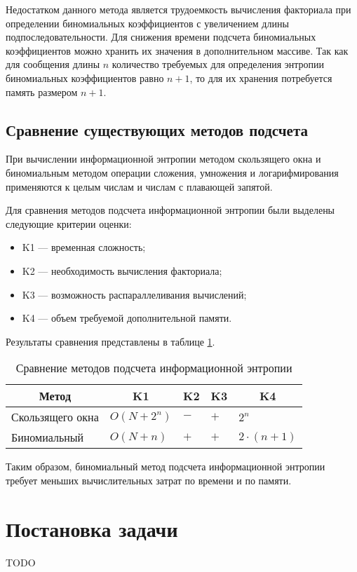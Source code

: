 Недостатком данного метода является трудоемкость вычисления факториала при определении биномиальных коэффициентов с увеличением длины подпоследовательности. Для снижения времени подсчета биномиальных коэффициентов можно хранить их значения в дополнительном массиве. Так как для сообщения длины $n$ количество требуемых для определения энтропии биномиальных коэффициентов равно $n + 1$, то для их хранения потребуется память размером $n + 1$.

\subsection{Сравнение существующих методов подсчета}

При вычислении информационной энтропии методом скользящего окна и биномиальным методом операции сложения, умножения и логарифмирования применяются к целым числам и числам с плавающей запятой.

Для сравнения методов подсчета информационной энтропии были выделены следующие критерии оценки:

\begin{itemize}
	\item K1 --- временная сложность;
	\item K2 --- необходимость вычисления факториала;
	\item K3 --- возможность распараллеливания вычислений;
	\item K4 --- объем требуемой дополнительной памяти.
\end{itemize}

Результаты сравнения представлены в таблице \ref{tab:comparison}.

\begin{table}[h]
    \caption{Сравнение методов подсчета информационной энтропии}
    \begin{center}
        \begin{tabular}{|l|l|l|l|l|}
        		\hline
            \multicolumn{1}{|c}{\textbf{Метод}} & 
            \multicolumn{1}{|c|}{\textbf{K1}} &
            \multicolumn{1}{c|}{\textbf{K2}} &
            \multicolumn{1}{c|}{\textbf{K3}} & 
            \multicolumn{1}{c|}{\textbf{K4}} \\ \hline
            Скользящего окна &  $O(N + 2^n)$ & $-$ & $+$ & $2^n$ \\ \hline
            Биномиальный &  $O(N + n)$ & $+$ & $+$ & $2 \cdot (n + 1)$ \\ \hline
        \end{tabular}
    \end{center}
    \label{tab:comparison}
\end{table}

Таким образом, биномиальный метод подсчета информационной энтропии требует меньших вычислительных затрат по времени и по памяти.

\section{Постановка задачи}

TODO